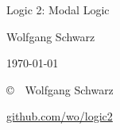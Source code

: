 \begingroup
\thispagestyle{empty}

\begin{center}


  

  {\huge Logic 2: Modal Logic\par}

  \vspace{5mm}
  
  

  \vspace{10mm}

  {\normalsize Wolfgang Schwarz}

  \vspace{2mm}
  {\normalsize \today}

\end{center}

\vfill
\endgroup
{

  \footnotesize

 \noindent \copyright\ \the\year\ Wolfgang Schwarz

 \smallskip
 \noindent \href{https://github.com/wo/logic2}{github.com/wo/logic2}

 \vspace{-1.5mm}
 \doclicenseThis

}

  

{
\small
\tableofcontents 
}

\normalsize



